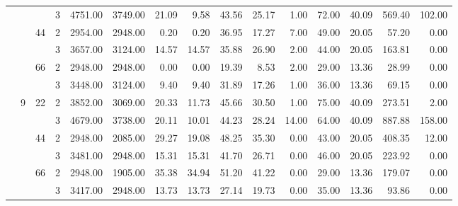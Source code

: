 \begin{tabular}{llllrrrrrrrrrrr}
               &   &    & 3 &  4751.00 &   3749.00 & 21.09 &    9.58 &   43.56 &   25.17 &    1.00 &   72.00 &   40.09 &  569.40 &   102.00 \\
\cline{3-15}
               &   & \multirow{2}{*}{44} & 2 &  2954.00 &   2948.00 &  0.20 &    0.20 &   36.95 &   17.27 &    7.00 &   49.00 &   20.05 &   57.20 &     0.00 \\
               &   &    & 3 &  3657.00 &   3124.00 & 14.57 &   14.57 &   35.88 &   26.90 &    2.00 &   44.00 &   20.05 &  163.81 &     0.00 \\
\cline{3-15}
               &   & \multirow{2}{*}{66} & 2 &  2948.00 &   2948.00 &  0.00 &    0.00 &   19.39 &    8.53 &    2.00 &   29.00 &   13.36 &   28.99 &     0.00 \\
               &   &    & 3 &  3448.00 &   3124.00 &  9.40 &    9.40 &   31.89 &   17.26 &    1.00 &   36.00 &   13.36 &   69.15 &     0.00 \\
\cline{2-15}
\cline{3-15}
               & \multirow{6}{*}{9} & \multirow{2}{*}{22} & 2 &  3852.00 &   3069.00 & 20.33 &   11.73 &   45.66 &   30.50 &    1.00 &   75.00 &   40.09 &  273.51 &     2.00 \\
               &   &    & 3 &  4679.00 &   3738.00 & 20.11 &   10.01 &   44.23 &   28.24 &   14.00 &   64.00 &   40.09 &  887.88 &   158.00 \\
\cline{3-15}
               &   & \multirow{2}{*}{44} & 2 &  2948.00 &   2085.00 & 29.27 &   19.08 &   48.25 &   35.30 &    0.00 &   43.00 &   20.05 &  408.35 &    12.00 \\
               &   &    & 3 &  3481.00 &   2948.00 & 15.31 &   15.31 &   41.70 &   26.71 &    0.00 &   46.00 &   20.05 &  223.92 &     0.00 \\
\cline{3-15}
               &   & \multirow{2}{*}{66} & 2 &  2948.00 &   1905.00 & 35.38 &   34.94 &   51.20 &   41.22 &    0.00 &   29.00 &   13.36 &  179.07 &     0.00 \\
               &   &    & 3 &  3417.00 &   2948.00 & 13.73 &   13.73 &   27.14 &   19.73 &    0.00 &   35.00 &   13.36 &   93.86 &     0.00 \\
\bottomrule
\end{tabular}
